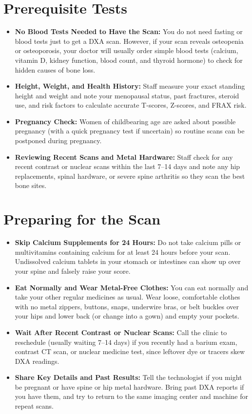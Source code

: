 \section{Prerequisite Tests}
\begin{itemize}
\item \textbf{No Blood Tests Needed to Have the Scan:} You do not need fasting or blood tests just to get a DXA scan. However, if your scan reveals osteopenia or osteoporosis, your doctor will usually order simple blood tests (calcium, vitamin D, kidney function, blood count, and thyroid hormone) to check for hidden causes of bone loss.
\item \textbf{Height, Weight, and Health History:} Staff measure your exact standing height and weight and note your menopausal status, past fractures, steroid use, and risk factors to calculate accurate T-scores, Z-scores, and FRAX risk.
\item \textbf{Pregnancy Check:} Women of childbearing age are asked about possible pregnancy (with a quick pregnancy test if uncertain) so routine scans can be postponed during pregnancy.
\item \textbf{Reviewing Recent Scans and Metal Hardware:} Staff check for any recent contrast or nuclear scans within the last 7--14 days and note any hip replacements, spinal hardware, or severe spine arthritis so they scan the best bone sites.
\end{itemize}

\section{Preparing for the Scan}
\begin{itemize}
\item \textbf{Skip Calcium Supplements for 24 Hours:} Do not take calcium pills or multivitamins containing calcium for at least 24 hours before your scan. Undissolved calcium tablets in your stomach or intestines can show up over your spine and falsely raise your score.
\item \textbf{Eat Normally and Wear Metal-Free Clothes:} You can eat normally and take your other regular medicines as usual. Wear loose, comfortable clothes with no metal zippers, buttons, snaps, underwire bras, or belt buckles over your hips and lower back (or change into a gown) and empty your pockets.
\item \textbf{Wait After Recent Contrast or Nuclear Scans:} Call the clinic to reschedule (usually waiting 7--14 days) if you recently had a barium exam, contrast CT scan, or nuclear medicine test, since leftover dye or tracers skew DXA readings.
\item \textbf{Share Key Details and Past Results:} Tell the technologist if you might be pregnant or have spine or hip metal hardware. Bring past DXA reports if you have them, and try to return to the same imaging center and machine for repeat scans.
\end{itemize}

